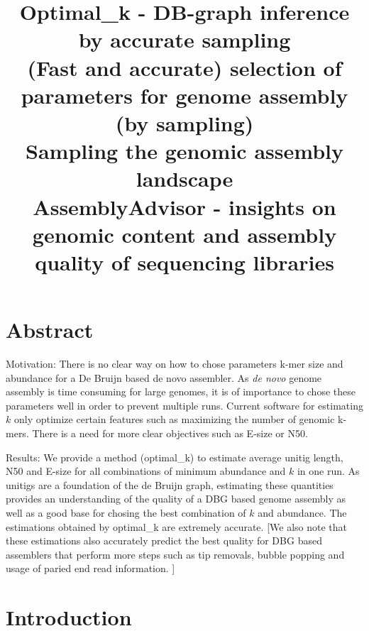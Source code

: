 \documentclass[a4paper,11pt]{article}
\newcommand{\kristoffer}[1]{{\color{red}{#1}}}
\begin{document}
\title{Optimal\_k - DB-graph inference by accurate sampling \\(Fast and accurate) selection of parameters for genome assembly (by sampling) \\ Sampling the genomic assembly landscape \\ AssemblyAdvisor - insights on genomic content and assembly quality of sequencing libraries} 
\author{}
\date{} %
\maketitle

\section{Abstract}
Motivation: There is no clear way on how to chose parameters k-mer size and abundance for a De Bruijn based de novo assembler. As \emph{de novo} genome assembly is time consuming for large genomes, it is of importance to chose these parameters well in order to prevent multiple runs. Current software for estimating $k$ only optimize certain features such as maximizing the number of genomic k-mers. There is a need for more clear objectives such as E-size or N50.

Results:
We provide a method (optimal\_k) to estimate average unitig length, N50 and E-size for all combinations of minimum abundance and $k$ in one run. As unitigs are a foundation of the de Bruijn graph, estimating these quantities provides an understanding of the quality of a DBG based genome assembly as well as a good base for chosing the best combination of $k$ and abundance. The estimations obtained by optimal\_k are extremely accurate. [We also note that these estimations also accurately predict the best quality for DBG based assemblers that perform more steps such as tip removals, bubble popping and usage of paried end read information. ]

\section{Introduction} %
\label{sec:introduction}

\kristoffer{ Mention that there are not many tools for computing optimal parameters at all. And make sure to mention that memry is not the issue. Mention the positives about our methods like speed and clear objective function but make sure to mention that it's memory requiring but thats not a problem if you are going to do the assembly anyway!!}
\end{document}
